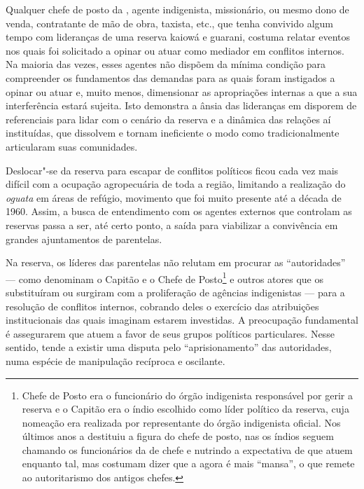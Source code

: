 Qualquer chefe de posto da , agente indigenista, missionário, ou
mesmo dono de venda, contratante de mão de obra, taxista, etc., que
tenha convivido algum tempo com lideranças de uma reserva kaiowá e
guarani, costuma relatar eventos nos quais foi solicitado a opinar ou
atuar como mediador em conflitos internos. Na maioria das vezes, esses
agentes não dispõem da mínima condição para compreender os fundamentos
das demandas para as quais foram instigados a opinar ou atuar e, muito
menos, dimensionar as apropriações internas a que a sua interferência
estará sujeita. Isto demonstra a ânsia das lideranças em disporem de
referenciais para lidar com o cenário da reserva e a dinâmica das
relações aí instituídas, que dissolvem e tornam ineficiente o modo como
tradicionalmente articularam suas comunidades. 

Deslocar"-se da reserva para escapar de conflitos políticos ficou cada
vez mais difícil com a ocupação agropecuária de toda a região,
limitando a realização do \emph{oguata} em áreas de refúgio, movimento que foi
muito presente até a década de 1960. Assim, a busca de entendimento com
os agentes externos que controlam as reservas passa a ser, até certo
ponto, a saída para viabilizar a convivência em grandes ajuntamentos de
parentelas. 

Na reserva, os líderes das parentelas não relutam em procurar as
``autoridades'' --- como denominam o Capitão e o Chefe de
Posto\footnote{Chefe de Posto era o funcionário do órgão indigenista
responsável por gerir a reserva e o Capitão era o índio escolhido como
líder político da reserva, cuja nomeação era realizada por
representante do órgão indigenista oficial. Nos últimos anos a 
destituiu a figura do chefe de posto, nas os índios seguem chamando os
funcionários da  de chefe e nutrindo a expectativa de que atuem
enquanto tal, mas costumam dizer que a  agora é mais ``mansa'', o
que remete ao autoritarismo dos antigos chefes.} e outros atores que os
substituíram ou surgiram com a proliferação de agências indigenistas ---
para a resolução de conflitos internos, cobrando deles o exercício das
atribuições institucionais das quais imaginam estarem investidas. A
preocupação fundamental é assegurarem que atuem a favor de seus grupos
políticos particulares. Nesse sentido, tende a existir uma disputa pelo
``aprisionamento'' das autoridades, numa espécie de manipulação recíproca
e oscilante.

